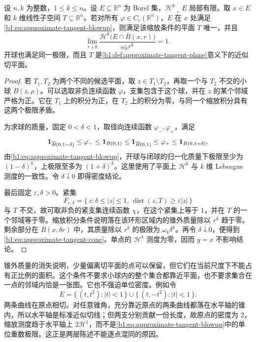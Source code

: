 \begin{proposition}\label{b1:prop:approximate-tangent-properties}
设 \(n,k\) 为整数，\(1\leq k\leq n\)。设 \(E\subseteq\mathbb R^n\) 为 Borel 集，\(\mathcal H^k\llcorner E\) 局部有限。取 \(x\in E\) 和 \(k\) 维线性子空间 \(T\subseteq\mathbb R^n\)。若对所有 \(\varphi\in C_c(\mathbb R^n)\)，\(E\) 在 \(x\) 处满足\eqref{b1:eq:approximate-tangent-blowup}，则满足该缩放条件的平面 \(T\) 唯一，并且
\begin{equation}\label{b1:eq:rectifiable-unit-density}
 \lim_{r\downarrow0}
 \frac{\mathcal H^k\bigl(E\cap\overline B(x,r)\bigr)}
      {\omega_k r^k}=1.
\end{equation}
开球也满足同一极限，而且 \(T\) 是\cref{b1:def:approximate-tangent-plane}意义下的近似切平面。
\end{proposition}
\begin{proof}
若 \(T_1,T_2\) 为两个不同的候选平面，取 \(z\in T_1\setminus T_2\)，再取一个与 \(T_2\) 不交的小球 \(B(z,\rho)\)。可以选取非负连续函数 \(\varphi\)，支集包含于这个球，并在 \(z\) 的某个邻域严格为正。它在 \(T_1\) 上的积分为正，在 \(T_2\) 上的积分为零，与同一个缩放积分具有这两个极限矛盾。

为求球的质量，固定 \(0<\delta<1\)，取径向连续函数 \(\varphi_-,\varphi_+\)，满足
\[
 {\bf1}_{\overline B(0,1-\delta)}
 \leq\varphi_-\leq{\bf1}_{B(0,1)}
 \leq{\bf1}_{\overline B(0,1)}
 \leq\varphi_+\leq{\bf1}_{B(0,1+\delta)}.
\]
由\eqref{b1:eq:approximate-tangent-blowup}，开球与闭球的归一化质量下极限至少为 \((1-\delta)^k\)，上极限至多为 \((1+\delta)^k\)。这里使用了平面上 \(\mathcal H^k\) 与 \(k\) 维 Lebesgue 测度的一致性。令 \(\delta\downarrow0\) 即得密度结论。

最后固定 \(\varepsilon,\delta>0\)。紧集
\[
 F_{\varepsilon,\delta}
 =\{\,z:\delta\leq|z|\leq1,\,
              \operatorname{dist}(z,T)\geq\varepsilon|z|\,\}
\]
与 \(T\) 不交，故可取非负的紧支集连续函数 \(\chi\)，在这个紧集上等于 \(1\)，并在 \(T\) 的一个邻域等于零。缩放积分条件说明落在该环形区域内的锥外质量除以 \(r^k\) 趋于零。剩余部分在 \(\overline B(x,\delta r)\) 中，其质量除以 \(r^k\) 的极限为 \(\omega_k\delta^k\)。再令 \(\delta\downarrow0\)，便得到\eqref{b1:eq:approximate-tangent-cone}。单点的 \(\mathcal H^k\) 测度为零，因而 \(y=x\) 不影响结论。
\end{proof}

锥外质量的消失说明，少量偏离切平面的点可以保留，但它们在当前尺度下不能占有正比例的面积。这个条件不要求小球内的整个集合都靠近平面，也不要求集合在一点的邻域内恰是一张图。它也不强迫单位密度。例如令
\[
 E=\{\,(t,t^2):|t|<1\,\}\cup
   \{\,(t,-t^2):|t|<1\,\}.
\]
两条曲线在原点相切。对任意锥角，充分靠近原点的两条曲线都落在水平轴的锥内，所以水平轴是标准近似切线；但两支分别贡献一份长度，故原点的密度为 \(2\)，缩放测度趋于水平轴上 \(2\mathcal H^1\)，而不是\eqref{b1:eq:approximate-tangent-blowup}中的单位重数极限。这正是两层陈述不能逐点混同的原因。

